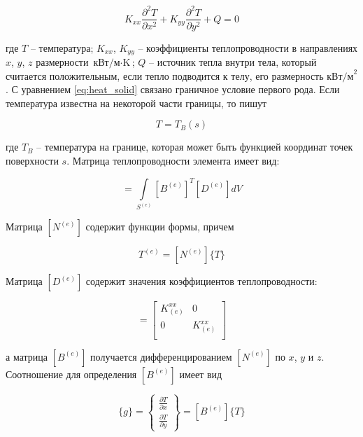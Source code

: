 \documentclass[a4paper, 14pt]{extarticle}
\begin{document}
\begin{equation}
	K_{xx} \frac{\partial^2 T}{\partial x^2} +
	K_{yy} \frac{\partial^2 T}{\partial y^2} +
	Q = 0
\end{equation} \label{eq:heat_solid}

где $T$ – температура; $K_{xx}$, $K_{yy}$ – коэффициенты теплопроводности в
направлениях $x$, $y$, $z$ размерности $ \text{кВт/м} \cdot \text{K} $; $Q$ –
источник тепла внутри тела, который считается положительным, если тепло
подводится к телу, его размерность $\text{кВт/м}^2$. С уравнением \ref{eq:heat_solid}
связано граничное условие первого рода. Если температура известна на некоторой
части границы, то пишут

\begin{equation}
	T = T_B(s)
\end{equation}

где $T_B$ – температура на границе, которая может быть функцией координат точек
поверхности $s$. Матрица теплопроводности элемента имеет вид:

\begin{equation}
	[k^{(e)}] =
	\int\limits_{S^{(e)}} [B^{(e)}]^T [D^{(e)}] dV
\end{equation}

Матрица $[N^{(e)}]$ содержит функции формы, причем

\begin{equation}
	T^{(e)} = [N^{(e)}]\{T\}
\end{equation}

Матрица $[D^{(e)}]$ содержит значения коэффициентов теплопроводности:

\begin{equation}
	[D^{(e)}] = \begin{bmatrix}
		K_{(e)}^{xx} & 0            \\
		0            & K_{(e)}^{xx} \\
	\end{bmatrix}
\end{equation}

а матрица $[B^{(e)}]$ получается дифференцированием $[N^{(e)}]$ по $x$, $y$ и
$z$. Соотношение для определения $[B^{(e)}]$ имеет вид

\begin{equation}
	\{g\} = \begin{Bmatrix}
	\frac{\partial T}{\partial x} \\
	\frac{\partial T}{\partial y}
	\end{Bmatrix} = [B^{(e)}]\{T\}
\end{equation}
\end{document}

